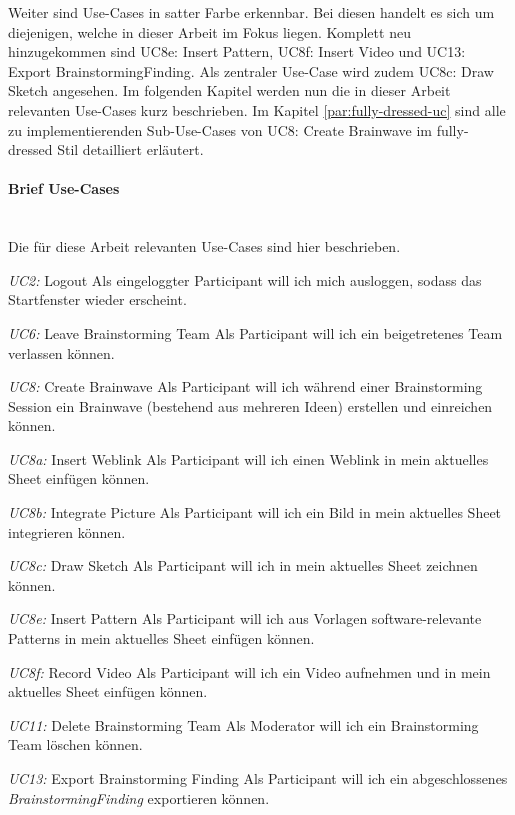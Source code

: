 Weiter sind Use-Cases in satter Farbe erkennbar. Bei diesen handelt es sich um diejenigen, welche in dieser Arbeit im Fokus liegen. Komplett neu hinzugekommen sind UC8e: Insert Pattern, UC8f: Insert Video und UC13: Export BrainstormingFinding. Als zentraler Use-Case wird zudem UC8c: Draw Sketch angesehen. Im folgenden Kapitel werden nun die in dieser Arbeit relevanten Use-Cases kurz beschrieben. Im Kapitel \ref{par:fully-dressed-uc} sind alle zu implementierenden Sub-Use-Cases von UC8: Create Brainwave im fully-dressed Stil detailliert erläutert.
\paragraph{Brief Use-Cases}~\\
Die für diese Arbeit relevanten Use-Cases sind hier beschrieben.

\begin{basedescript}{
		\desclabelstyle{\multilinelabel}
		\desclabelwidth{4.5cm}
		\setlength{\itemsep}{5ex}}
	
	\item[\textit{UC2: }Logout] Als eingeloggter Participant will ich mich ausloggen, sodass das Startfenster wieder erscheint.
	
	\item[\textit{UC6: }Leave Brainstorming Team] Als Participant will ich ein beigetretenes Team verlassen können.
		
	\item[\textit{UC8: }Create Brainwave] Als Participant will ich während einer Brainstorming Session ein Brainwave (bestehend aus mehreren Ideen) erstellen und einreichen können. 
	
	\item[\textit{UC8a: }Insert Weblink] Als Participant will ich einen Weblink in mein aktuelles Sheet einfügen können.
	
	\item[\textit{UC8b: }Integrate Picture] Als Participant will ich ein Bild in mein aktuelles Sheet integrieren können.
	
	\item[\textit{UC8c: }Draw Sketch] Als Participant will ich in mein aktuelles Sheet zeichnen können.
	
	\item[\textit{UC8e: }Insert Pattern] Als Participant will ich aus Vorlagen software-relevante Patterns in mein aktuelles Sheet einfügen können.
	
	\item[\textit{UC8f: }Record Video] Als Participant will ich ein Video aufnehmen und in mein aktuelles Sheet einfügen können.
	
	\item[\textit{UC11: }Delete Brainstorming Team] Als Moderator will ich ein Brainstorming Team löschen können.
	
	\item[\textit{UC13: }Export Brainstorming Finding] Als Participant will ich ein abgeschlossenes \textit{BrainstormingFinding }exportieren können. 
\end{basedescript}
\vspace{1cm}

